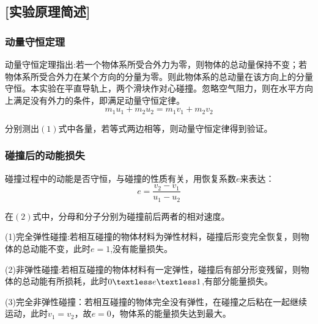 \documentclass[UTF8]{article}
\begin{document}
	\subsection*{[实验原理简述]}
	\subsubsection*{动量守恒定理}
	\par 动量守恒定理指出:若一个物体系所受合外力为零，则物体的总动量保持不变；若物体系所受合外力在某个方向的分量为零。则此物体系的总动量在该方向上的分量守恒。本实验在平直导轨上，两个滑块作对心碰撞。忽略空气阻力，则在水平方向上满足没有外力的条件，即满足动量守恒定律。
	\begin{equation}
		m_1u_1+m_2u_2=m_1v_1+m_2v_2
	\end{equation}
	\par 分别测出$(1)$式中各量，若等式两边相等，则动量守恒定律得到验证。
	\subsubsection*{碰撞后的动能损失}
	\par 碰撞过程中的动能是否守恒，与碰撞的性质有关，用恢复系数$e$来表达：
	\begin{equation}
		e=\frac{v_2-v_1}{u_1-u_2}
	\end{equation}
	\par 在$(2)$式中，分母和分子分别为碰撞前后两者的相对速度。
	\par (1)完全弹性碰撞:若相互碰撞的物体材料为弹性材料，碰撞后形变完全恢复，则物体的总动能不变，此时$e=1$,没有能量损失。
	\par (2)非弹性碰撞:若相互碰撞的物体材料有一定弹性，碰撞后有部分形变残留，则物体的总动能有所损耗，此时$0\textless e\textless1$,有部分能量损失。
	\par (3)完全非弹性碰撞：若相互碰撞的物体完全没有弹性，在碰撞之后粘在一起继续运动，此时$v_1=v_2$，故$e=0$，物体系的能量损失达到最大。
\end{document}
